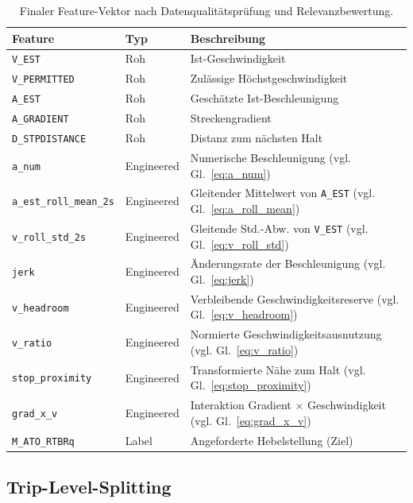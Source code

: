 \begin{table}[h]
    \centering
    \small
    \caption[Finaler Feature-Vektor]{Finaler Feature-Vektor nach Datenqualitätsprüfung und Relevanzbewertung.}
    \label{tab:final_features}
    \begin{tabularx}{\textwidth}{@{} l l X @{}}
        \toprule
        \textbf{Feature} & \textbf{Typ} & \textbf{Beschreibung} \\
        \midrule
        \texttt{V\_EST} & Roh & Ist-Geschwindigkeit \\
        \texttt{V\_PERMITTED} & Roh & Zulässige Höchstgeschwindigkeit \\
        \texttt{A\_EST} & Roh & Geschätzte Ist-Beschleunigung \\
        \texttt{A\_GRADIENT} & Roh & Streckengradient \\
        \texttt{D\_STPDISTANCE} & Roh & Distanz zum nächsten Halt \\
        \midrule
        \texttt{a\_num} & Engineered & Numerische Beschleunigung (vgl. Gl.~\eqref{eq:a_num}) \\
        \texttt{a\_est\_roll\_mean\_2s} & Engineered & Gleitender Mittelwert von \texttt{A\_EST} (vgl. Gl.~\eqref{eq:a_roll_mean}) \\
        \texttt{v\_roll\_std\_2s} & Engineered & Gleitende Std.-Abw. von \texttt{V\_EST} (vgl. Gl.~\eqref{eq:v_roll_std}) \\
        \texttt{jerk} & Engineered & Änderungsrate der Beschleunigung (vgl. Gl.~\eqref{eq:jerk}) \\
        \texttt{v\_headroom} & Engineered & Verbleibende Geschwindigkeitsreserve (vgl. Gl.~\eqref{eq:v_headroom}) \\
        \texttt{v\_ratio} & Engineered & Normierte Geschwindigkeitsausnutzung (vgl. Gl.~\eqref{eq:v_ratio}) \\
        \texttt{stop\_proximity} & Engineered & Transformierte Nähe zum Halt (vgl. Gl.~\eqref{eq:stop_proximity}) \\
        \texttt{grad\_x\_v} & Engineered & Interaktion Gradient $\times$ Geschwindigkeit (vgl. Gl.~\eqref{eq:grad_x_v}) \\
        \midrule
        \texttt{M\_ATO\_RTBRq} & Label & Angeforderte Hebelstellung (Ziel) \\
        \bottomrule
    \end{tabularx}
\end{table}

\subsection{Trip-Level-Splitting}
\label{subsec:split}

